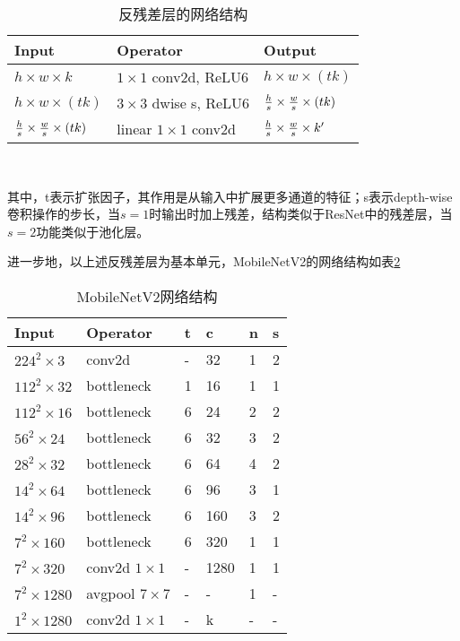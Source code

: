 \begin{table}[htbp]
  \centering
  \caption{反残差层的网络结构}
  \label{tab:InverseResidual}
    \begin{tabular}{p{80pt}p{120pt}p{80pt}}
      \toprule
      Input & Operator & Output\\
      \midrule
      $h \times w \times k$  &  $1 \times 1$ conv2d, ReLU6 &   $h \times w \times (tk)$ \\
      $h \times w \times (tk)$  &  $3 \times 3$ dwise s, ReLU6 & ${h \over s} \times {w \over s} \times (tk)$ \\
      ${h \over s} \times {w \over s} \times (tk)$ &   linear $1 \times 1$ conv2d & ${h \over s} \times {w \over s} \times k'$\\
      \bottomrule
    \end{tabular}\\[5pt]
\end{table}

其中，t表示扩张因子，其作用是从输入中扩展更多通道的特征；s表示depth-wise卷积操作的步长，当$s=1$时输出时加上残差，结构类似于ResNet中的残差层，当$s=2$功能类似于池化层。

进一步地，以上述反残差层为基本单元，MobileNetV2的网络结构如表\ref{tab:MobileNetV2}


\begin{table}[htbp]
  \centering
  \caption{MobileNetV2网络结构}
  \label{tab:MobileNetV2}
    \begin{tabular}{p{80pt}p{80pt}p{40pt}p{40pt}p{40pt}p{40pt}}
      \toprule
      Input & Operator & t & c & n & s\\
      \midrule
      $224^2 \times 3$  &  conv2d & - & 32 & 1 & 2 \\
      $112^2 \times 32$  &  bottleneck & 1 & 16 & 1 & 1 \\
      $112^2 \times 16$  &  bottleneck & 6 & 24 & 2 & 2 \\
      $56^2 \times 24$  &  bottleneck & 6 & 32 & 3 & 2 \\
      $28^2 \times 32$  &  bottleneck & 6 & 64 & 4 & 2 \\
      $14^2 \times 64$  &  bottleneck & 6 & 96 & 3 & 1 \\
      $14^2 \times 96$  &  bottleneck & 6 & 160 & 3 & 2 \\
      $7^2 \times 160$  &  bottleneck & 6 & 320 & 1 & 1 \\
      $7^2 \times 320$  &  conv2d $1\times1$ & - & 1280 & 1 & 1 \\
      $7^2 \times 1280$  &  avgpool $7\times7$ & - & - & 1 & - \\
      $1^2 \times 1280$  &  conv2d $1\times1$ & - & k & - & - \\
      \bottomrule
    \end{tabular}\\[5pt]
\end{table}



